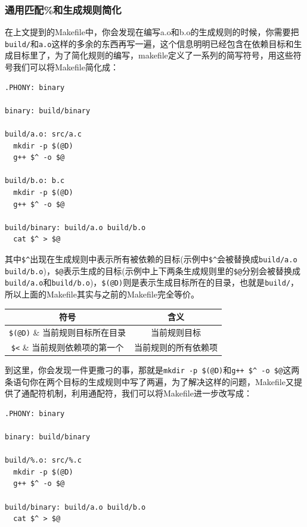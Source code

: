 \documentclass[lang=cn,11pt,a4paper]{elegantpaper}
\begin{document}
\subsubsection{通用匹配\%和生成规则简化}

在上文提到的Makefile中，你会发现在编写a.o和b.o的生成规则的时候，你需要把\lstinline!build/!和\lstinline!a.o!这样的多余的东西再写一遍，这个信息明明已经包含在依赖目标和生成目标里了，为了简化规则的编写，makefile定义了一系列的简写符号，用这些符号我们可以将Makefile简化成：

\begin{lstlisting}
.PHONY: binary

binary: build/binary

build/a.o: src/a.c
  mkdir -p $(@D)
  g++ $^ -o $@

build/b.o: b.c
  mkdir -p $(@D)
  g++ $^ -o $@

build/binary: build/a.o build/b.o
  cat $^ > $@
\end{lstlisting}

其中\lstinline!$^!出现在生成规则中表示所有被依赖的目标(示例中\lstinline!$^!会被替换成\lstinline!build/a.o build/b.o!)，\lstinline!$@!表示生成的目标(示例中上下两条生成规则里的\lstinline!$@!分别会被替换成\lstinline!build/a.o!和\lstinline!build/b.o!)，\lstinline!$(@D)!则是表示生成目标所在的目录，也就是\lstinline!build/!，所以上面的Makefile其实与之前的Makefile完全等价。

\begin{table}[htbp]
\centering
\begin{tabular}{|c|c|}
\hline
符号&含义 \\\hline
\lstinline|$(@D)| & 当前规则目标所在目录 \\\hline
\lstinline|$@| & 当前规则目标 \\\hline
\lstinline|$<| & 当前规则依赖项的第一个 \\\hline
\lstinline|$^| & 当前规则的所有依赖项 \\\hline
\end{tabular}
\end{table}

到这里，你会发现一件更撒刁的事，那就是\lstinline!mkdir -p $(@D)!和\lstinline!g++ $^ -o $@!这两条语句你在两个目标的生成规则中写了两遍，为了解决这样的问题，Makefile又提供了通配符机制，利用通配符，我们可以将Makefile进一步改写成：

\begin{lstlisting}
.PHONY: binary

binary: build/binary

build/%.o: src/%.c
  mkdir -p $(@D)
  g++ $^ -o $@

build/binary: build/a.o build/b.o
  cat $^ > $@
\end{lstlisting}
\end{document}
